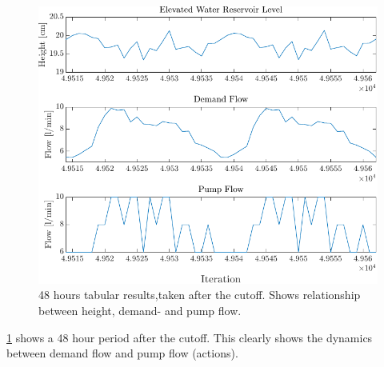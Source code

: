 \begin{figure}[h!]
	\centering
	\includegraphics[width=0.7\linewidth]{figures/TabularResults1.pdf}
	\caption{48 hours tabular results,taken after the cutoff. Shows relationship between height, demand- and pump flow.}
	\label{fig:TabularResults2}
\end{figure} 

\cref{fig:TabularResults2} shows a 48 hour period after the cutoff. This clearly shows the dynamics between demand flow and pump flow (actions).

